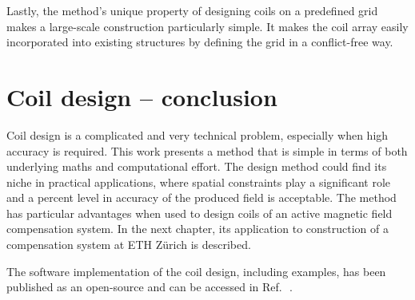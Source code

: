 Lastly, the method's unique property of designing coils on a predefined grid makes a large-scale construction particularly simple.
It makes the coil array easily incorporated into existing structures by defining the grid in a conflict-free way.




\section*{Coil design -- conclusion}
Coil design is a complicated and very technical problem, especially when high accuracy is required. This work presents a method that is simple in terms of both underlying maths and computational effort.
The design method could find its niche in practical applications, where spatial constraints play a significant role and a percent level in accuracy of the produced field is acceptable.
The method has particular advantages when used to design coils of an active magnetic field compensation system.
In the next chapter, its application to construction of a compensation system at ETH Zürich is described.

The software implementation of the coil design, including examples, has been published as an open-source and can be accessed in Ref.\,~\cite{Coilsjlcode}.
